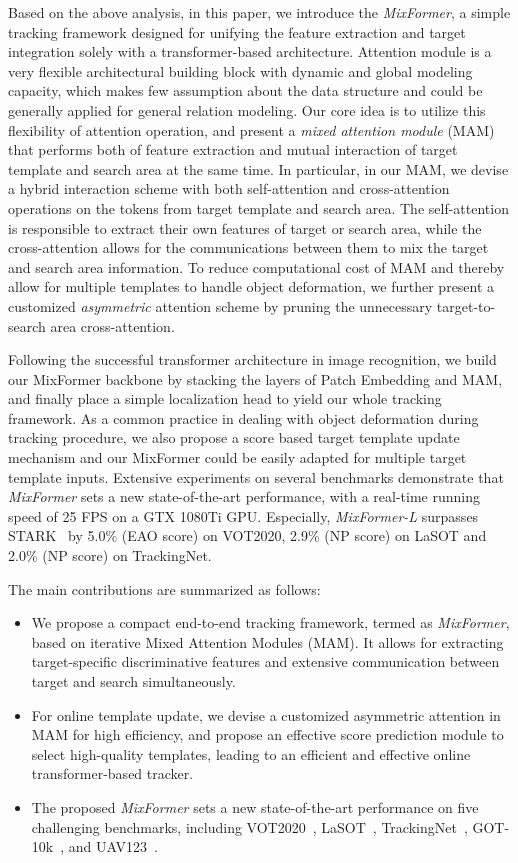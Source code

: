 Based on the above analysis, in this paper, we introduce the \emph{MixFormer}, a simple tracking framework designed for unifying the feature extraction and target integration solely with a transformer-based architecture. Attention module is a very flexible architectural building block with dynamic and global modeling capacity, which makes few assumption about the data structure and could be generally applied for general relation modeling. Our core idea is to utilize this flexibility of attention operation, and present a {\em mixed attention module} (MAM) that performs both of feature extraction and mutual interaction of target template and search area at the same time. In particular, in our MAM, we devise a hybrid interaction scheme with both self-attention and cross-attention operations on the tokens from target template and search area. The self-attention is responsible to extract their own features of target or search area, while the cross-attention allows for the communications between them to mix the target and search area information. To reduce computational cost of MAM and thereby allow for multiple templates to handle object deformation, we further present a customized {\em asymmetric} attention scheme by pruning the unnecessary target-to-search area cross-attention.

Following the successful transformer architecture in image recognition, we build our MixFormer backbone by stacking the layers of Patch Embedding and MAM, and finally place a simple localization head to yield our whole tracking framework. 
As a common practice in dealing with object deformation during tracking procedure, we also propose a score based target template update mechanism and our MixFormer could be easily adapted for multiple target template inputs. Extensive experiments on several benchmarks demonstrate that \textit{MixFormer} sets a new state-of-the-art performance, with a real-time running speed of 25 FPS on a GTX 1080Ti GPU.
Especially, \textit{MixFormer-L} surpasses STARK~\cite{stark} by 5.0\% (EAO score) on VOT2020, 2.9\% (NP score) on LaSOT and 2.0\% (NP score) on TrackingNet.

The main contributions are summarized as follows:
\begin{itemize}
\item We propose a compact end-to-end tracking framework, termed as \emph{MixFormer}, based on iterative Mixed Attention Modules (MAM). It allows for extracting target-specific discriminative features and extensive communication between target and search simultaneously.
\item For online template update, we devise a customized asymmetric attention in MAM for high efficiency, and propose an effective score prediction module to select high-quality templates, leading to an efficient and effective online transformer-based tracker. 
\item The proposed \textit{MixFormer} sets a new state-of-the-art performance on five challenging benchmarks, including VOT2020~\cite{vot2020}, LaSOT~\cite{lasot}, TrackingNet~\cite{trackingnet}, GOT-10k~\cite{got10k}, and UAV123~\cite{uav123}.

\end{itemize}

